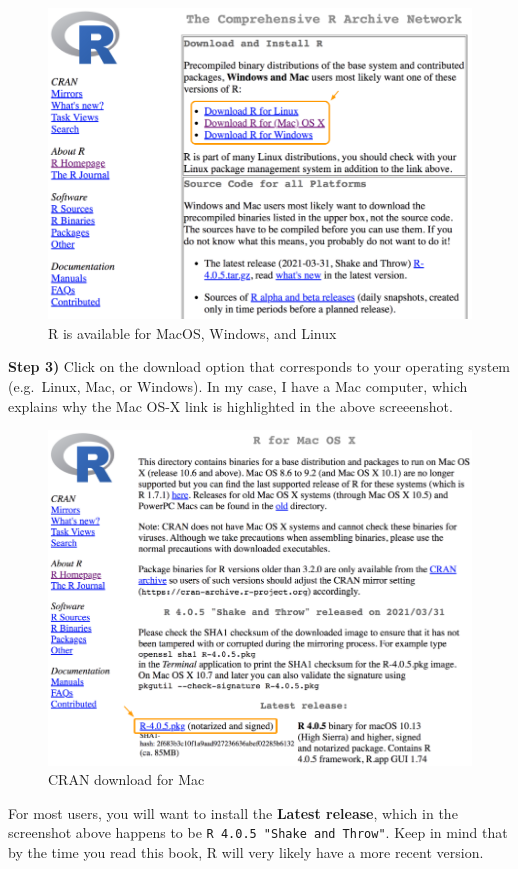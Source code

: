 \documentclass[
]{book}
\begin{document}
\begin{figure}

{\centering \includegraphics[width=0.7\linewidth]{images/install/cran-download} 

}

\caption{R is available for MacOS, Windows, and Linux}\label{fig:unnamed-chunk-6}
\end{figure}

\textbf{Step 3)} Click on the download option that corresponds to your operating
system (e.g.~Linux, Mac, or Windows). In my case, I have a Mac computer, which
explains why the Mac OS-X link is highlighted in the above screeenshot.

\begin{figure}

{\centering \includegraphics[width=0.7\linewidth]{images/install/cran-mac} 

}

\caption{CRAN download for Mac}\label{fig:unnamed-chunk-7}
\end{figure}

For most users, you will want to install the \textbf{Latest release}, which in the screenshot above happens to be \texttt{R\ 4.0.5\ "Shake\ and\ Throw"}. Keep in mind that
by the time you read this book, R will very likely have a more recent version.
\end{document}
